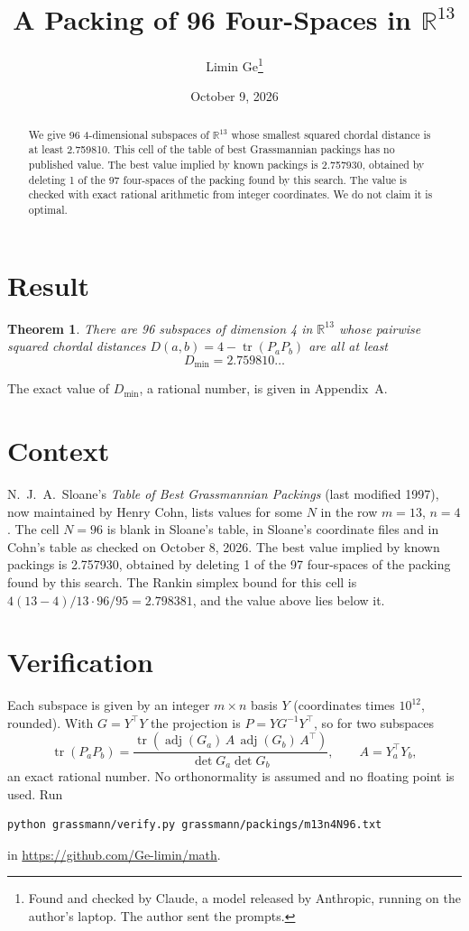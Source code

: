 \documentclass[11pt,a4paper]{article}
\title{A Packing of 96 Four-Spaces in $\mathbb{R}^{13}$}
\author{Limin Ge\thanks{Found and checked by Claude, a model released by Anthropic, running on the author's laptop. The author sent the prompts.}}
\date{October 9, 2026}
\newtheorem*{theorem}{Theorem}
\begin{document}
\maketitle
\begin{abstract}
We give 96 4-dimensional subspaces of $\mathbb{R}^{13}$ whose smallest squared chordal distance is at least 2.759810. This cell of the table of best Grassmannian packings has no published value. The best value implied by known packings is 2.757930, obtained by deleting 1 of the 97 four-spaces of the packing found by this search. The value is checked with exact rational arithmetic from integer coordinates. We do not claim it is optimal.
\end{abstract}

\section{Result}
\begin{theorem}
There are 96 subspaces of dimension 4 in $\mathbb{R}^{13}$ whose pairwise squared chordal distances $D(a,b) = 4 - \operatorname{tr}(P_aP_b)$ are all at least
\[ D_{\min} = 2.759810\ldots \]
\end{theorem}
The exact value of $D_{\min}$, a rational number, is given in Appendix~A.


\section{Context}
N.~J.~A.~Sloane's \emph{Table of Best Grassmannian Packings} (last modified 1997), now maintained by Henry Cohn, lists values for some $N$ in the row $m=13$, $n=4$. The cell $N=96$ is blank in Sloane's table, in Sloane's coordinate files and in Cohn's table as checked on October 8, 2026. The best value implied by known packings is 2.757930, obtained by deleting 1 of the 97 four-spaces of the packing found by this search. The Rankin simplex bound for this cell is $4(13-4)/13\cdot 96/95 = 2.798381$, and the value above lies below it.


\section{Verification}
Each subspace is given by an integer $m\times n$ basis $Y$ (coordinates times $10^{12}$, rounded). With $G=Y^\top Y$ the projection is $P=YG^{-1}Y^\top$, so for two subspaces
\[ \operatorname{tr}(P_aP_b)=\frac{\operatorname{tr}(\operatorname{adj}(G_a)\,A\,\operatorname{adj}(G_b)\,A^\top)}{\det G_a\det G_b},\qquad A=Y_a^\top Y_b, \]
an exact rational number. No orthonormality is assumed and no floating point is used. Run
\begin{verbatim}
python grassmann/verify.py grassmann/packings/m13n4N96.txt
\end{verbatim}
in \url{https://github.com/Ge-limin/math}.
\end{document}
